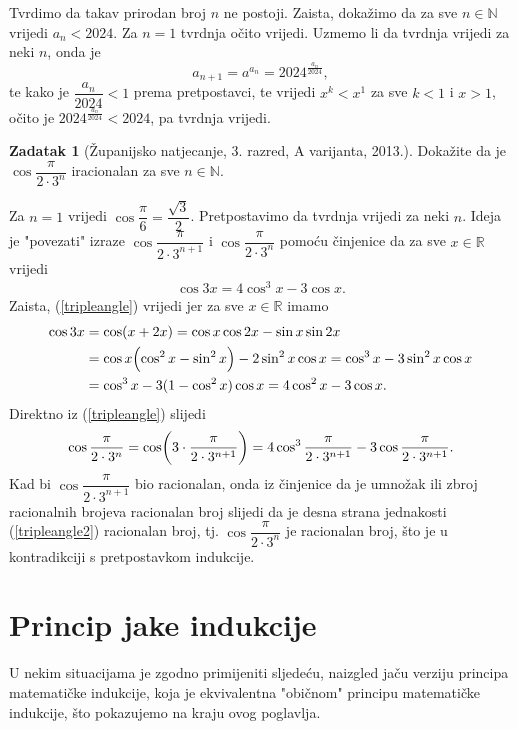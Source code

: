 \documentclass{book}
\let\originalleft\left
\let\originalright\right
\renewcommand{\left}{\mathopen{}\mathclose\bgroup\originalleft}
\renewcommand{\right}{\aftergroup\egroup\originalright}
\renewenvironment{proof}{%
    \vspace{-\parskip}\begin{oldproof}%
    }{%
    \end{oldproof}%
}
\theoremstyle{definition}
\theoremstyle{definition}
\newtheorem{exercise}{Zadatak}
\theoremstyle{remark}
\begin{document}
\begin{proof}[Rješenje]
Tvrdimo da takav prirodan broj $n$ ne postoji. Zaista, dokažimo da za sve $n\in \mathbb{N}$ vrijedi $a_n<2024$. Za $n=1$ tvrdnja očito vrijedi. Uzmemo li da tvrdnja vrijedi za neki $n$, onda je $$a_{n+1}=a^{a_n}=2024^{\frac{a_n}{2024}},$$ 
te kako je $\dfrac{a_n}{2024}<1$ prema pretpostavci, te vrijedi $x^k<x^1$ za sve $k<1$ i $x>1$, očito je $2024^{\frac{a_n}{2024}}<2024$, pa tvrdnja vrijedi.
\end{proof}
\begin{exercise}[Županijsko natjecanje, 3. razred, A varijanta, 2013.] Dokažite da je $\cos{\dfrac{\pi}{2\cdot 3^n}}$ iracionalan za sve $n\in \mathbb{N}$.
\end{exercise}
\begin{proof}
Za $n=1$ vrijedi $\cos{\dfrac{\pi}{6}}=\dfrac{\sqrt{3}}{2}$. Pretpostavimo da tvrdnja vrijedi za neki $n$. Ideja je "povezati" izraze $\cos{\dfrac{\pi}{2\cdot 3^{n+1}}}$ i $\cos{\dfrac{\pi}{2\cdot 3^{n}}}$ pomoću činjenice da za sve $x\in \mathbb{R}$ vrijedi
\begin{align}
\label{tripleangle}
\cos{3x}=4\cos^3{x}-3\cos{x}.
\end{align}
Zaista, (\ref{tripleangle}) vrijedi jer za sve $x\in \mathbb{R}$ imamo
\begin{align*}
\cos{3x}&=\cos(x+2x)=\cos{x}\cos{2x}-\sin{x}\sin{2x}\\
&=\cos{x}\left(\cos^2{x}-\sin^2{x}\right)-2\sin^2{x}\cos{x}=\cos^3{x}-3\sin^2{x}\cos{x}\\
&=\cos^3x-3(1-\cos^2{x})\cos{x}=4\cos^2{x}-3\cos{x}.
\end{align*}
Direktno iz (\ref{tripleangle}) slijedi
\begin{align}
\label{tripleangle2}
\cos{\dfrac{\pi}{2\cdot 3^{n}}}=\cos\left(3\cdot \dfrac{\pi}{2\cdot 3^{n+1}}\right)=4\cos^3{\dfrac{\pi}{2\cdot 3^{n+1}}}-3\cos{\dfrac{\pi}{2\cdot 3^{n+1}}}.
\end{align}
Kad bi $\cos{\dfrac{\pi}{2\cdot 3^{n+1}}}$ bio racionalan, onda iz činjenice da je umnožak ili zbroj racionalnih brojeva racionalan broj slijedi da je desna strana jednakosti (\ref{tripleangle2}) racionalan broj, tj. $\cos{\dfrac{\pi}{2\cdot 3^{n}}}$ je racionalan broj, što je u kontradikciji s pretpostavkom indukcije.
\end{proof}
\section{Princip jake indukcije}
U nekim situacijama je zgodno primijeniti sljedeću, naizgled jaču verziju principa matematičke indukcije, koja je ekvivalentna "običnom" principu matematičke indukcije, što pokazujemo na kraju ovog poglavlja.
\end{document}
